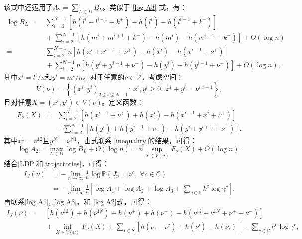 该式中还运用了$A_2 = \sum_{L\in D}B_L$。类似于 \ref{log A3} 式，有：
\begin{equation}\label{log BL}
    \begin{split}
    \log B_L =&\;\sum_{i=2}^{N-1}[h(l^i+l^{i-1}+k^+)-h(l^i)-h(l^{i-1}+k^+)]\\
    &\;+\sum_{i=2}^{N-1}[h(m^i+m^{i+1}+k^-)-h(m^i)-h(m^{i+1}+k^-)]+O(\log n)\\
    =&\;\sum_{i=2}^{N-1}n[h(x^i+x^{i-1}+\nu^+)-h(x^i)-h(x^{i-1}+\nu^+)]\\
    &\;+\sum_{i=2}^{N-1}n[h(y^i+y^{i+1}+\nu^-)-h(y^i)-h(y^{i+1}+\nu^-)]+O(\log n),
    \end{split}
\end{equation}
其中$x^i = l^i/n$和$y^i = m^i/n$。对于任意的$\nu \in \mathcal{V}$，考虑空间：
\begin{equation*}
    V(\nu) = \left\{\left(x^{i},y^{i}\right)_{2\le i\le N-1}:\;x^i,y^i\geq0,\;x^{i}+y^{i}=\nu^{i,i+1}\right\},
\end{equation*}
且对任意$X = (x^i, y^i) \in V(\nu)$。定义函数：
\begin{equation}\label{formula:F}
    \begin{split}
    F_{\nu}(X)
    =&\sum_{i=2}^{N-1}\left[ h\left(x^{i-1}+\nu^+\right) + h\left(x^{i}\right) - h\left(x^{i-1}+x^{i}+\nu^+\right) \right] \\
    &+ \sum_{i=2}^{N-1} \left[h\left(y^{i}\right) + h\left(y^{i+1} +\nu^-\right)-h\left(y^{i} +y^{i+1} +\nu^-\right)\right].
    \end{split}
\end{equation}
其中$x^1=\nu^{12}$且$y^N=\nu^{N1}$，由式联系 \ref{inequality}的结果，可得：
\begin{equation}\label{log A2}
    \log A_2 = \max_{L\in D}\log B_L+O(\log n)
    = n\sup_{X\in V(\nu)}F_{\nu}(X)+O(\log n).
\end{equation}
结合\eqref{LDP}和\eqref{trajectories}，可得：
\begin{equation*}
    \begin{split}
    I_J(\nu) &= -\lim_{n\to\infty}\frac{1}{n}\log\mathbb{P}\left(J^c_n=\nu^c,\;\forall c\in\mathcal{C}\right)\\
    &= -\lim_{n\to\infty}\frac{1}{n}\left[\log A_1+\log A_2+\log A_3+\sum_{c\in\mathcal{C}}k^c\log\gamma^c\right].
    \end{split}
\end{equation*}
再联系\eqref{log A1}, \eqref{log A3}，和 \eqref{log A2}式，可得：
\begin{equation}\label{ratefunction}
    \begin{split}
    I_J(\nu) =&\; \left[h\left(\nu^{12}\right)+h\left(\nu^{1N}\right)
    +h\left(\nu^+\right)+h\left(\nu^-\right)-h\left(\nu^{12}+\nu^{1N}+\nu^++\nu^-\right)\right] \\
    &\;+\inf_{X\in V(\nu)}F_{\nu}(X)+\sum_{i\in S}\left[ h\left(\nu_i-\nu^i\right)+h\left(\nu^i\right)
    -h\left(\nu_i\right)\right]-\sum_{c\in\mathcal{C}}\nu^c\log\gamma^c,
    \end{split}
\end{equation}
